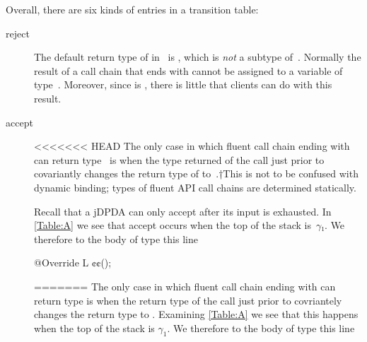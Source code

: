 Overall, there are six kinds of entries in a transition table:
\begin{description}
  \item[\textsf{reject}]
  The default return type of \cc{\$()} in~ is , which
  is \emph{not} a subtype of~. Normally the result of a call chain that ends with \cc{\$()}
  cannot be assigned to a variable of type~. Moreover, since  is ,
  there is little that clients can do with this result.
  \item[\textsf{accept}]
<<<<<<< HEAD
  The only case in which fluent call chain ending with \cc{\$()} can return
  type~ is when the type returned of the call just prior to  covariantly
  changes the return type of \cc{\$()} to~.†{This is not to be confused with dynamic binding;
  types of fluent API call chains are determined statically.}
  \par
  Recall that a jDPDA can only accept after its input is exhausted.
  In \cref{Table:A} we see that \textsf{accept} occurs when the top of the stack is~$γ₁$.
  We therefore to the body of type  this line
  \begin{JAVA}
@Override L ¢\gobble$¢$();
  \end{JAVA}
=======
    The only case in which fluent call chain ending with \cc{\$()} can return
      type  is when the return type of the call just prior to  covriantely changes the return
        type to .
    Examining \cref{Table:A} we see that this happens when the top of the stack is $\gamma_1$. 
    We therefore to the body of type  this line 
     

\end{description}
